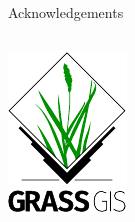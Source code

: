 \documentclass[xcolor={dvipsnames,usenames},beamer,aspectratio=169]{beamer}
\newcommand{\backupend}{
   \setcounter{framenumber}{\value{finalframe}}
}
\begin{document}
\begin{frame}{Acknowledgements}
\begin{columns}
\begin{column}{0.3\textwidth}
\begin{center}
  \includegraphics[width=\textwidth]{logos/grass_gis}
\end{center}

\end{column}
\end{columns}

\end{frame}

\backupend
\end{document}
